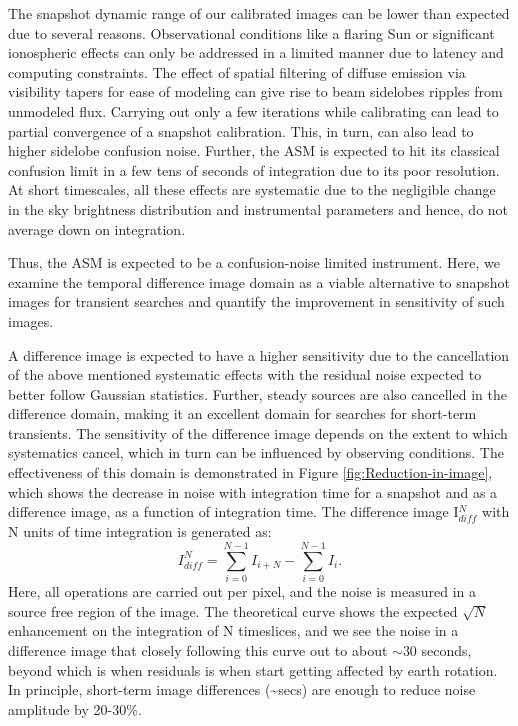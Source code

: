 \documentclass{aa}
\begin{document}
The snapshot dynamic  range of our calibrated images can  be lower than expected
due  to  several  reasons.   Observational  conditions like  a  flaring  Sun  or
significant ionospheric effects can only be addressed in a limited manner due to
latency and  computing constraints. The  effect of spatial filtering  of diffuse
emission  via visibility  tapers for  ease  of modeling  can give  rise to  beam
sidelobes ripples from unmodeled flux.  Carrying out only a few iterations while
calibrating can lead to partial  convergence of a snapshot calibration. This, in
turn, can  also lead  to higher  sidelobe confusion noise.  Further, the  ASM is
expected  to hit  its classical  confusion limit  in a  few tens  of  seconds of
integration due to its poor  resolution. At short timescales, all these effects
are systematic due  to the negligible change in  the sky brightness distribution
and instrumental parameters and hence, do not average down on integration.

Thus, the ASM is expected to  be a confusion-noise limited instrument.  Here, we
examine the temporal difference image domain as a viable alternative to snapshot
images for  transient searches and  quantify the improvement in  sensitivity of
such images.

A  difference  image  is expected  to  have  a  higher  sensitivity due  to  the
cancellation of the  above mentioned systematic effects with  the residual noise
expected to better follow Gaussian statistics.  Further, steady sources are also
cancelled in the  difference domain, making it an  excellent domain for searches
for short-term transients.   The sensitivity of the difference  image depends on
the  extent to  which systematics  cancel, which  in turn  can be  influenced by
observing  conditions.  The  effectiveness  of this  domain  is demonstrated  in
Figure  \ref{fig:Reduction-in-image}, which  shows  the decrease  in noise  with
integration time  for a  snapshot and as  a difference  image, as a  function of
integration  time.  The  difference  image  I$^N_{diff}$ with  N  units of  time
integration is generated as:
\begin{equation}
I^N_{diff} = \sum\limits_{i=0}^{N-1} I_{i+N} - \sum\limits_{i=0}^{N-1} I_i. \label{eq:diff_img}
\end{equation}
Here, all operations are  carried out per pixel, and the noise  is measured in a
source  free region  of the  image.  The  theoretical curve  shows  the expected
$\sqrt{N}$ enhancement on the integration of  N timeslices, and we see the noise
in  a difference  image  that closely  following  this curve  out  to about  $\sim$$30$
seconds, beyond which is when residuals  is when start getting affected by earth
rotation.     In    principle,     \mbox    {short-term}    image    differences
(\textasciitilde{}secs) are enough to reduce noise amplitude by 20-30\%.
\end{document}
